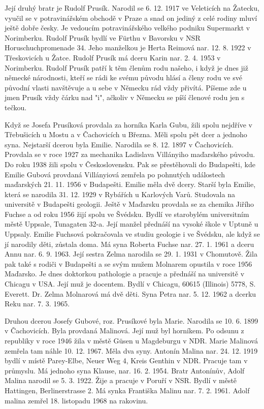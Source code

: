 \documentclass[../dejiny-rodu-prusiku.tex]{subfiles}
\begin{document}
Její druhý bratr je Rudolf Prusík. Narodil se 6. 12. 1917 ve Veleticích na Žatecku, vyučil se v potravinářském obchodě v Praze a snad on jediný z celé rodiny mluví ještě dobře česky. Je vedoucím potravinářského velkého podniku Supermarkt v Norimberku. Rudolf Prusík bydlí ve Fürthu v Bavorsku v NSR Horuschuchpromenade 34. Je­ho manželkou je Herta Reimová nar. 12. 8. 1922 v Třeskovicích u Žatce. Rudolf Prusík má dceru Karin nar. 2. 4. 1953 v Norimberku. Rudolf Prusík patří k těm členům ro­du našeho, i když je dnes již německé národnosti, kteří se rádi ke svému původu hlásí a členy rodu ve své původ­ní vlasti navštěvuje a u sebe v Německu rád vždy přivítá. Píšeme zde u jmen Prusík vždy čárku nad "i", ačkoliv v Německu se píší členové rodu jen s tečkou.

Když se Josefa Prusíková provdala za horníka Karla Gubu, žili spolu nejdříve v Třebušicích u Mostu a v Čachovicích u Března. Měli spolu pět dcer a jednoho syna. Nejstarší dcerou byla Emilie. Narodila se 8. 12. 1897 v Čachovicích. Provdala se v roce 1927 za mechanika Ladislava Villányiho maďarského původu. Do roku 1938 žili spolu v Československu. Pak se přestěhovali do Budapešti, kde Emilie Gubová provdaná Villányiová zemřela po pohnutých událostech maďarských 21. 11. 1956 v Budapešti. Emilie měla dvě dcery. Starší byla Emilie, která se narodila 31. 12. 1929 v Rybářích u Karlových Varů. Studovala na universitě v Budapešti geologii. Ještě v Maďarsku provdala se za che­mika Jiřího Fuchse a od roku 1956 žijí spolu ve Švédsku. Bydlí ve starobylém universitním městě Uppsale, Tunagaten 32-a. Její manžel přednáší na vysoké škole v Uptuně u Uppsaly. Emilie Fuchsová pokračovala ve studiu geologie
i ve Švédsku, ale když se jí narodily děti, zůstala doma. Má syna Roberta Fuchse nar. 27. 1. 1961 a dceru Annu nar. 6. 9. 1963. Její sestra Zelma narodila se 29. 1. 1931 v Chomutově. Žila pak také s rodiči v Bu­dapešti a se svým mužem Molnarem opustila v roce 1956 Maďarsko. Je dnes doktorkou pathologie a pracuje a přednáší na universitě v Chicagu v USA. Její muž je docentem. Bydlí v Chicagu, 60615 (Illinois) 5778, S. Everett. Dr. Zelma Molnarová má dvě děti. Syna Petra nar. 5. 12. 1962 a dcerku Reku nar. 7. 3. 1965.

Druhou dcerou Josefy Gubové, roz. Prusíkové byla Marie. Narodila se 10. 6. 1899 v Čachovicích. Byla provda­ná Malinová. Její muž byl horníkem. Po odsunu z republi­ky v roce 1946 žila v městě Güsen u Magdeburgu v NDR. Marie Malinová zemřela tam náhle 10. 12. 1967. Měla dva syny. Antonín Malina nar. 24. 12. 1919 bydlí v místě Parey-Elbe, Neuer Weg 4, Kreis Genthin v NDR. Pracuje tam v průmyslu. Má jednoho syna Klause, nar. 16. 2. 1954. Bratr Antonínův, Adolf Malina narodil se 5. 3. 1922. Žije a pracuje v Poruří v NSR. Bydlí v městě Hattingen, Berlinerstrasse 2. Má synka Františka Mali­nu nar. 7. 2. 1961. Adolf malina zemřel 18. listopadu 1968 na rakovinu.
\end{document}
